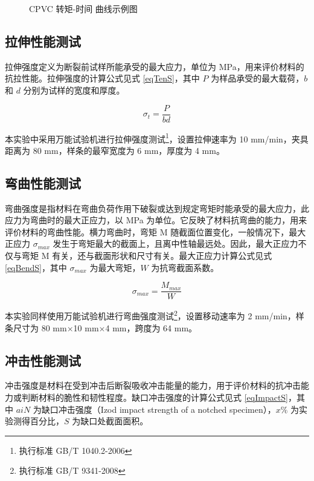 \begin{figure}[!htb]
    \begin{center}
        
    \end{center}
    \caption{CPVC 转矩-时间 曲线示例图}
    \label{figExHakee}
\end{figure}

\subsection{拉伸性能测试}
拉伸强度定义为断裂前试样所能承受的最大应力，单位为 MPa，用来评价材料的抗拉性能。拉伸强度的计算公式见式 \eqref{eqTenS}，其中 $P$ 为样品承受的最大载荷，$b$ 和 $d$ 分别为试样的宽度和厚度。

\begin{equation}
    \label{eqTenS}
    \sigma_t = \frac{P}{bd}
\end{equation}

本实验中采用万能试验机进行拉伸强度测试\footnote{执行标准 GB/T 1040.2-2006}，设置拉伸速率为 10 mm/min，夹具距离为 80 mm，样条的最窄宽度为 6 mm，厚度为 4 mm。

\subsection{弯曲性能测试}
弯曲强度是指材料在弯曲负荷作用下破裂或达到规定弯矩时能承受的最大应力，此应力为弯曲时的最大正应力，以 MPa 为单位。它反映了材料抗弯曲的能力，用来评价材料的弯曲性能。横力弯曲时，弯矩 M 随截面位置变化，一般情况下，最大正应力 $\sigma_{max}$ 发生于弯矩最大的截面上，且离中性轴最远处。因此，最大正应力不仅与弯矩 M 有关，还与截面形状和尺寸有关。最大正应力计算公式见式 \eqref{eqBendS}，其中 $\sigma_{max}$ 为最大弯矩，$W$ 为抗弯截面系数。

\begin{equation}
    \label{eqBendS}
    \sigma_{max} = \frac{M_{max}}{W}
\end{equation}

本实验同样使用万能试验机进行弯曲强度测试\footnote{执行标准 GB/T 9341-2008}，设置移动速率为 2 mm/min，样条尺寸为 80 mm$\times$10 mm$\times$4 mm，跨度为 64 mm。

\subsection{冲击性能测试}
冲击强度是材料在受到冲击后断裂吸收冲击能量的能力，用于评价材料的抗冲击能力或判断材料的脆性和韧性程度。缺口冲击强度的计算公式见式 \eqref{eqImpactS}，其中 $aiN$ 为缺口冲击强度（Izod impact strength of a notched specimen），$x\%$ 为实验测得百分比，$S$ 为缺口处截面面积。

